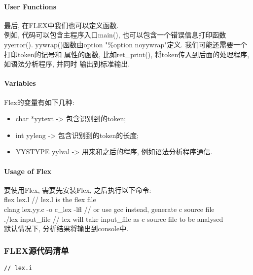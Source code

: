 \paragraph{User Functions}
最后, 在FLEX中我们也可以定义函数. \\
例如, 代码可以包含主程序入口main(), 也可以包含一个错误信息打印函数yyerror().
yywrap()函数由option "\%option noyywrap"定义. 我们可能还需要一个打印token的记号和
属性的函数, 比如ret\_print(), 将token传入到后面的处理程序, 如语法分析程序, 并同时
输出到标准输出.

\paragraph{Variables}
Flex的变量有如下几种:
\begin{itemize}
  \item char *yytext -> 包含识别到的token;
  \item int yyleng -> 包含识别到的token的长度;
  \item YYSTYPE yylval -> 用来和之后的程序, 例如语法分析程序通信.
\end{itemize}

\paragraph{Usage of Flex}
要使用Flex, 需要先安装Flex, 之后执行以下命令: \\[0.5cm]
flex lex.l // lex.l is the flex file \\[0.5cm]
clang lex.yy.c -o c\_lex -lfl // or use gcc instead, generate c source file \\[0.5cm]
./lex input\_file // lex will take input\_file as c source file to be analysed \\[0.5cm]
默认情况下, 分析结果将输出到console中.

\subsubsection{FLEX源代码清单}
\begin{lstlisting}
// lex.i
\end{lstlisting}

